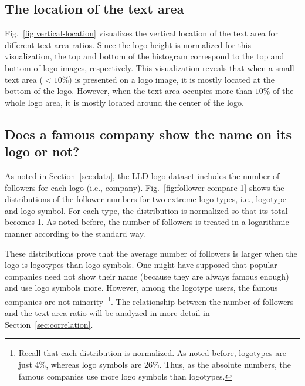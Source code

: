\documentclass[runningheads]{llncs}
\begin{document}
\subsection{The location of the text area}
Fig.~\ref{fig:vertical-location} visualizes the vertical location of the text area for different text area ratios. Since the logo height is normalized for this visualization, the top and bottom of the histogram correspond to the top and bottom of logo images, respectively. This visualization reveals that when a small text area ($<10\%$) is presented on a logo image, it is mostly located at the bottom of the logo. However, when the text area occupies more than $10\%$ of the whole logo area, it is mostly located around the center of the logo.
\subsection{Does a famous company show the name on its logo or not?\label{sec:two-hists}}
As noted in Section~\ref{sec:data}, the LLD-logo dataset includes the number of followers for each logo (i.e., company). Fig.~\ref{fig:follower-compare-1} shows the distributions of the follower
numbers for two extreme logo types, i.e., logotype and logo symbol. For each type, the distribution is normalized so that its total becomes 1. As noted before, the number of followers is treated in a logarithmic manner according to the standard way. \par
These distributions prove that the average number of followers is larger when the logo is logotypes than logo symbols. One might have supposed that popular companies need not show their name (because they are always famous enough) and use logo symbols more. However, among the logotype users, the famous companies are not minority~\footnote{Recall that each distribution is normalized. As noted before, logotypes are just 4\%, whereas logo symbols are 26\%. Thus, as the absolute numbers, the famous companies use more logo symbols than logotypes.}.  The relationship between the number of followers and the text area ratio will be analyzed in more detail in Section~\ref{sec:correlation}.


\end{document}
